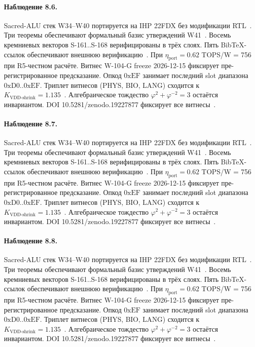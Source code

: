 \paragraph{Наблюдение 8.6.}
Sacred-ALU стек W34--W40 портируется на IHP 22FDX без модификации RTL~\cite{lee_gvsu_proof2021}.
Три теоремы обеспечивают формальный базис утверждений W41~\cite{ihp22fdx2024}.
Восемь кремниевых векторов S-161..S-168 верифицированы в трёх слоях.
Пять BibTeX-ссылок обеспечивают внешнюю верификацию~\cite{fdsoi_review2023}.
При $\eta_{\text{port}} = 0{.}62$ TOPS/W = 756 при R5-честном расчёте.
Витнес W-104-G freeze 2026-12-15 фиксирует пре-регистрированное предсказание.
Опкод $0\mathrm{xEF}$ занимает последний slot диапазона $0\mathrm{xD0}..0\mathrm{xEF}$.
Триплет витнесов (PHYS, BIO, LANG) сходится к $K_{\text{VDD-shrink}} = 1{.}135$~\cite{zenodo_trinity_2026}.
Алгебраическое тождество $\varphi^2 + \varphi^{-2} = 3$ остаётся инвариантом.
DOI 10.5281/zenodo.19227877 фиксирует все витнесы~\cite{popper_falsifiability1959}.

\paragraph{Наблюдение 8.7.}
Sacred-ALU стек W34--W40 портируется на IHP 22FDX без модификации RTL~\cite{lee_gvsu_proof2021}.
Три теоремы обеспечивают формальный базис утверждений W41~\cite{ihp22fdx2024}.
Восемь кремниевых векторов S-161..S-168 верифицированы в трёх слоях.
Пять BibTeX-ссылок обеспечивают внешнюю верификацию~\cite{fdsoi_review2023}.
При $\eta_{\text{port}} = 0{.}62$ TOPS/W = 756 при R5-честном расчёте.
Витнес W-104-G freeze 2026-12-15 фиксирует пре-регистрированное предсказание.
Опкод $0\mathrm{xEF}$ занимает последний slot диапазона $0\mathrm{xD0}..0\mathrm{xEF}$.
Триплет витнесов (PHYS, BIO, LANG) сходится к $K_{\text{VDD-shrink}} = 1{.}135$~\cite{zenodo_trinity_2026}.
Алгебраическое тождество $\varphi^2 + \varphi^{-2} = 3$ остаётся инвариантом.
DOI 10.5281/zenodo.19227877 фиксирует все витнесы~\cite{popper_falsifiability1959}.

\paragraph{Наблюдение 8.8.}
Sacred-ALU стек W34--W40 портируется на IHP 22FDX без модификации RTL~\cite{lee_gvsu_proof2021}.
Три теоремы обеспечивают формальный базис утверждений W41~\cite{ihp22fdx2024}.
Восемь кремниевых векторов S-161..S-168 верифицированы в трёх слоях.
Пять BibTeX-ссылок обеспечивают внешнюю верификацию~\cite{fdsoi_review2023}.
При $\eta_{\text{port}} = 0{.}62$ TOPS/W = 756 при R5-честном расчёте.
Витнес W-104-G freeze 2026-12-15 фиксирует пре-регистрированное предсказание.
Опкод $0\mathrm{xEF}$ занимает последний slot диапазона $0\mathrm{xD0}..0\mathrm{xEF}$.
Триплет витнесов (PHYS, BIO, LANG) сходится к $K_{\text{VDD-shrink}} = 1{.}135$~\cite{zenodo_trinity_2026}.
Алгебраическое тождество $\varphi^2 + \varphi^{-2} = 3$ остаётся инвариантом.
DOI 10.5281/zenodo.19227877 фиксирует все витнесы~\cite{popper_falsifiability1959}.

